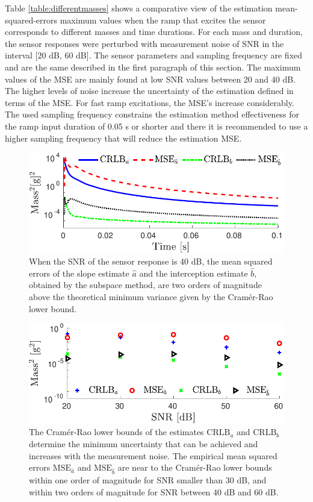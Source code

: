 Table \ref{table:differentmasses} shows a comparative view of the estimation mean-squared-errors maximum values when the ramp that excites the sensor corresponds to different masses and time durations. 
For each mass and duration, the sensor responses were perturbed with measurement noise of SNR in the interval [20 dB, 60 dB].
The sensor parameters and sampling frequency are fixed and are the same described in the first paragraph of this section.
The maximum values of the MSE are mainly found at low SNR values between 20 and 40 dB.
The higher levels of noise increase the uncertainty of the estimation defined in terms of the MSE.
For fast ramp excitations, the MSE's increase considerably.
The used sampling frequency constrains the estimation method effectiveness for the ramp input duration of 0.05 s or shorter and there it is recommended to use  a higher sampling frequency that will reduce the estimation MSE.


\begin{figure}[!htbp]
\centering
\includegraphics[width=1\columnwidth]{./ChapterRampInput/fig/Fig_5.pdf} 
\caption{ \label{fig:CRLB_MSE_ab_dd_40dB_MC_10000} When the SNR of the sensor response is 40 dB, the mean squared errors of the slope estimate $\widehat{a}$ and the interception estimate $\widehat{b}$, obtained by the subspace method, are two orders of magnitude above the theoretical minimum variance given by the Cram\'er-Rao lower bound.}
\end{figure}


\begin{figure}[!htbp]
\centering
\includegraphics[width=1\columnwidth]{./ChapterRampInput/fig/Fig_6.pdf} 
\caption{ \label{fig:CRLB_MSE_SNR_ab_dd_MC_10000} The Cram\'er-Rao lower bounds of the estimates $\mathrm{CRLB}_a$ and $\mathrm{CRLB}_b$ determine the minimum uncertainty that can be achieved and increases with the measurement noise. 
The empirical mean squared errors $\mathrm{MSE}_{\hat{a}}$ and $\mathrm{MSE}_{\hat{b}}$ are near to the Cram\'er-Rao lower bounds within one order of magnitude for SNR smaller than 30 dB, and within two orders of magnitude for SNR between 40 dB and 60 dB. }
\end{figure}



